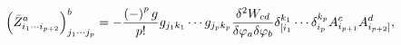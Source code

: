 \begin{equation}
\left( \bar{Z}_{i_{1}\cdots i_{p+2}}^{a}\right) _{j_{1}\cdots j_{p}}^{b}=-%
\frac{\left( -\right) ^{p}g}{p!}g_{j_{1}k_{1}}\cdots g_{j_{p}k_{p}}\frac{%
\delta ^{2}W_{cd}}{\delta \varphi _{a}\delta \varphi _{b}}\delta
_{[i_{1}}^{k_{1}}\cdots \delta
_{i_{p}}^{k_{p}}A_{i_{p+1}}^{c}A_{i_{p+2}]}^{d},  \label{i26}
\end{equation}

